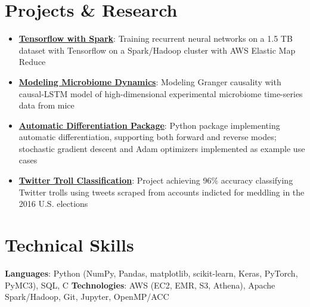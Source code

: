 \documentclass[letterpaper,11pt]{article}
\newcommand{\resumeItem}[2]{
  \item\small{
    \textbf{#1}{: #2 \vspace{-2pt}}
  }
}
\newcommand{\resumeSubItem}[2]{\resumeItem{#1}{#2}\vspace{-4pt}}
\newcommand{\resumeSubHeadingListStart}{\begin{itemize}[leftmargin=*]}
\newcommand{\resumeSubHeadingListEnd}{\end{itemize}}
\begin{document}
\section{Projects \& Research}

  \resumeSubHeadingListStart

  \resumeSubItem{\href{https://github.com/dylanrandle/spark-tensorflow}{Tensorflow with Spark}}
    {Training recurrent neural networks on a 1.5 TB dataset with Tensorflow on a Spark/Hadoop cluster with AWS Elastic Map Reduce}

  \resumeSubItem{\href{https://github.com/dylanrandle/microbiome}{Modeling Microbiome Dynamics}}
    {Modeling Granger causality with causal-LSTM model of high-dimensional experimental microbiome time-series data from mice}

  \resumeSubItem{\href{https://github.com/dylanrandle/autograd}{Automatic Differentiation Package}}
    {Python package implementing automatic differentiation, supporting both forward and reverse modes;
     stochastic gradient descent and Adam optimizers implemented as example use cases}

  \resumeSubItem{\href{https://dylanrandle.github.io/troll_classification}{Twitter Troll Classification}}
    {Project achieving 96\% accuracy classifying Twitter trolls using tweets scraped from accounts indicted
     for meddling in the 2016 U.S. elections}

  \resumeSubHeadingListEnd

%
\section{Technical Skills}
  \textbf{Languages}{: Python (NumPy, Pandas, matplotlib, scikit-learn, Keras, PyTorch, PyMC3), SQL, C}
  \linebreak
  \textbf{Technologies}{: AWS (EC2, EMR, S3, Athena), Apache Spark/Hadoop, Git, Jupyter, OpenMP/ACC}


\end{document}
